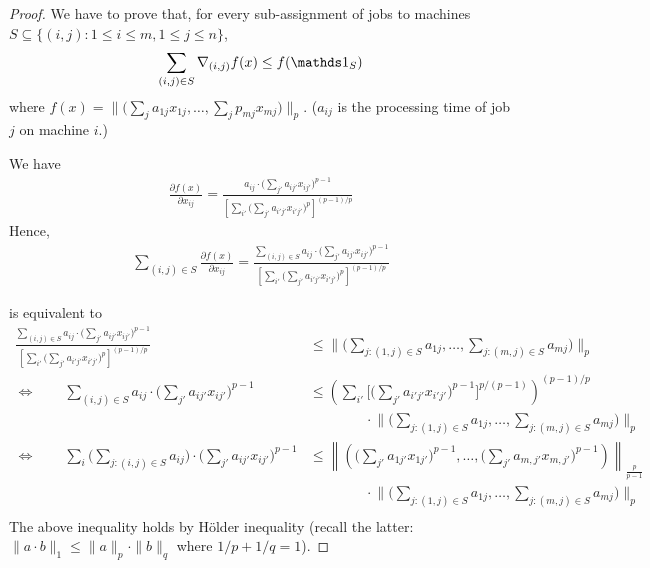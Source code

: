 \begin{proof}
We have to prove that, for every sub-assignment of jobs to machines $S \subseteq \{(i,j): 1 \leq i \leq m, 1 \leq j \leq n\}$, 
\begin{align}	\label{eq:lp-smooth}
\sum_{(i,j) \in S} \nabla_{(i,j)} f(x) \leq f(\one_{S})
\end{align}
where $f(x) = \| \bigl( \sum_{j} a_{1j} x_{1j}, \ldots, \sum_{j} p_{mj} x_{mj} \bigr)\|_{p}$.
($a_{ij}$ is the processing time of job $j$ on machine $i$.)

We have 
%
\begin{align*}
\frac{\partial f(x)}{\partial x_{ij}} 
= \frac{a_{ij} \cdot \bigl( \sum_{j'} a_{ij'} x_{ij'} \bigr)^{p-1} }{ \left[ \sum_{i'} \bigl( \sum_{j'} a_{i'j'} x_{i'j'} \bigr)^{p} \right]^{(p-1)/p}} 
\end{align*}
Hence, 
\begin{align*}
\sum_{(i,j) \in S} \frac{\partial f(x)}{\partial x_{ij}} 
= \frac{ \sum_{(i,j) \in S} a_{ij} \cdot \bigl( \sum_{j'} a_{ij'} x_{ij'} \bigr)^{p-1} }{ \left[ \sum_{i'} \bigl( \sum_{j'} a_{i'j'} x_{i'j'} \bigr)^{p} \right]^{(p-1)/p}} 
\end{align*}

 is equivalent to 
\begin{align*}
 \frac{ \sum_{(i,j) \in S} a_{ij} \cdot \bigl( \sum_{j'} a_{ij'} x_{ij'} \bigr)^{p-1} }{ \left[ \sum_{i'} \bigl( \sum_{j'} a_{i'j'} x_{i'j'} \bigr)^{p} \right]^{(p-1)/p}} 
&\leq  \biggl \| \biggl( \sum_{j: (1,j) \in S} a_{1j}, \ldots, \sum_{j: (m,j) \in S} a_{mj}  \biggr) \biggr\|_{p} \\
%
\Longleftrightarrow \qquad
	\sum_{(i,j) \in S} a_{ij} \cdot \bigl( \sum_{j'} a_{ij'} x_{ij'} \bigr)^{p-1} &\leq 
		\left ( \sum_{i'} \biggl [ \biggl( \sum_{j'} a_{i'j'} x_{i'j'} \biggr)^{p-1} \biggr]^{p/(p-1)} \right)^{(p-1)/p} \\
			& \qquad \qquad \cdot \biggl \| \biggl( \sum_{j: (1,j) \in S} a_{1j}, \ldots, \sum_{j: (m,j) \in S} a_{mj}  \biggr) \biggr\|_{p} \\
%
\Longleftrightarrow \qquad
	\sum_{i} \biggl ( \sum_{j: (i,j) \in S} a_{ij} \biggr) \cdot \biggl( \sum_{j'} a_{ij'} x_{ij'} \biggr)^{p-1} &\leq 
		\left \| \left( \biggl( \sum_{j'} a_{1j'} x_{1j'} \biggr)^{p-1}, \ldots, \biggl( \sum_{j'} a_{m,j'} x_{m,j'} \biggr)^{p-1} \right)   \right \|_{\frac{p}{p-1}}  \\
			& \qquad \qquad \cdot \biggl \| \biggl( \sum_{j: (1,j) \in S} a_{1j}, \ldots, \sum_{j: (m,j) \in S} a_{mj}  \biggr) \biggr\|_{p} \\
\end{align*}
The above inequality holds by H\"older inequality (recall the latter: $\| a \cdot b\|_{1} \leq \| a \|_{p} \cdot \| b \|_{q}$ where $1/p + 1/q = 1$).
\end{proof}

